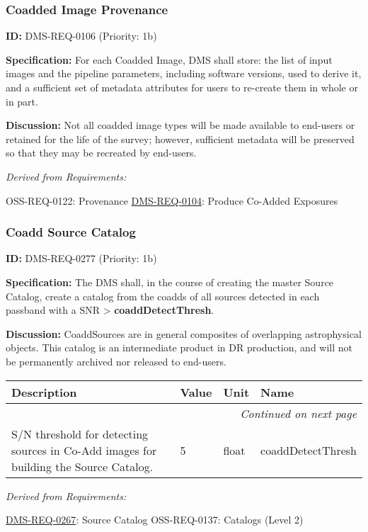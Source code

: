 \documentclass[SE,toc,lsstdraft]{lsstdoc}
\makeatletter
\newcommand{\paramname}[1]{\hspace{0pt}#1}
\newcommand{\unitname}[1]{\hspace{0pt}#1}
\newenvironment{parameters}[0]{%
\setlength\LTleft{0pt}
\setlength\LTright{\fill}
\begin{small}
\begin{longtable}[]{|p{0.49\textwidth}|l|p{0.6in}|p{1.70in}@{}|}

\hline \textbf{Description} & \textbf{Value} & \textbf{Unit} & \textbf{Name} \\ \hline
\endhead

\hline \multicolumn{4}{r}{\emph{Continued on next page}} \\
\endfoot

\hline\hline
\endlastfoot
}{%
\hline
\end{longtable}
\end{small}
}
\makeatother
\begin{document}
\subsubsection{Coadded Image Provenance}

\label{DMS-REQ-0106}
\textbf{ID:} DMS-REQ-0106 (Priority: 1b)

\textbf{Specification:} For each Coadded Image, DMS shall store: the list of input images and the pipeline parameters, including software versions, used to derive it, and a sufficient set of metadata attributes for users to re-create them in whole or in part.

\textbf{Discussion:} Not all coadded image types will be made available to end-users or retained for the life of the survey; however, sufficient metadata will be preserved so that they may be recreated by end-users.

\emph{Derived from Requirements:}

OSS-REQ-0122:
Provenance \newline
\hyperref[DMS-REQ-0104]{DMS-REQ-0104}:
Produce Co-Added Exposures \newline

\subsubsection{Coadd Source Catalog}

\label{DMS-REQ-0277}
\textbf{ID:} DMS-REQ-0277 (Priority: 1b)

\textbf{Specification:} The DMS shall, in the course of creating the master Source Catalog, create a catalog from the coadds of all sources detected in each passband with a SNR > \textbf{coaddDetectThresh}.

\textbf{Discussion: }CoaddSources are in general composites of overlapping astrophysical objects. This catalog is an intermediate product in DR production, and will not be permanently archived nor released to end-users.

\begin{parameters}
S/N threshold for detecting sources in Co-Add images for building the Source Catalog.
&
5
&
\unitname{%
float
}
&
\paramname{%
coaddDetectThresh
} \\\hline
\end{parameters}

\emph{Derived from Requirements:}

\hyperref[DMS-REQ-0267]{DMS-REQ-0267}:
Source Catalog \newline
OSS-REQ-0137:
Catalogs (Level 2) \newline
\end{document}
